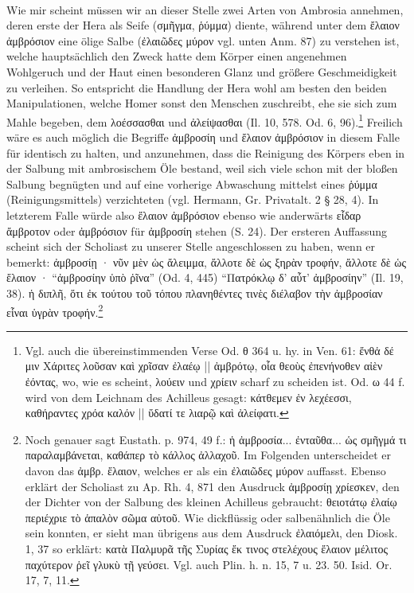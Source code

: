 \documentclass[a4paper, 11pt, oneside]{article}
\begin{document}
\paragraph{}
Wie mir scheint müssen wir an dieser Stelle zwei Arten von Ambrosia annehmen, deren erste der Hera als Seife (σμῆγμα, ῥύμμα) diente, während unter dem ἔλαιον ἀμβρόσιον eine ölige Salbe (ἐλαιῶδες μύρον vgl. unten Anm. 87) zu verstehen ist, welche hauptsächlich den Zweck hatte dem Körper einen angenehmen Wohlgeruch und der Haut einen besonderen Glanz und größere Geschmeidigkeit zu verleihen. So entspricht die Handlung der Hera wohl am besten den beiden Manipulationen, welche Homer sonst den Menschen zuschreibt, ehe sie sich zum Mahle begeben, dem λοέσσασθαι und ἀλείψασθαι (Il. 10, 578. Od. 6, 96).\footnote{Vgl. auch die übereinstimmenden Verse Od. θ 364 u. hy. in Ven. 61: ἔνθἁ δέ μιν Χάριτες λοῦσαν καὶ χρῖσαν ἐλαέῳ || ἀμβρότῳ, οἷα θεοὺς ἐπενήνοθεν αἰὲν ἐόντας, wo, wie es scheint, λούειν und χρίειν scharf zu scheiden ist. Od. ω 44 f. wird von dem Leichnam des Achilleus gesagt: κάτθεμεν ἐν λεχέεσσι, καθήραντες χρόα καλόν || ὕδατί τε λιαρῷ καὶ ἀλείφατι.} Freilich wäre es auch möglich die Begriffe ἀμβροσίη und ἔλαιον ἀμβρόσιον in diesem Falle für identisch zu halten, und anzunehmen, dass die Reinigung des Körpers eben in der Salbung mit ambrosischem Öle bestand, weil sich viele schon mit der bloßen Salbung begnügten und auf eine vorherige Abwaschung mittelst eines ῥύμμα (Reinigungsmittels) verzichteten (vgl. Hermann, Gr. Privatalt. 2 § 28, 4). In letzterem Falle würde also ἔλαιον ἀμβρόσιον ebenso wie anderwärts εἶδαρ ἄμβροτον oder ἀμβρόσιον für ἀμβροσίη stehen (S. 24). Der ersteren Auffassung scheint sich der Scholiast zu unserer Stelle angeschlossen zu haben, wenn er bemerkt: ἀμβροσίῃ · νῦν μὲν ὡς ἄλειμμα, ἄλλοτε δὲ ὡς ξηρὰν τροφήν, ἄλλοτε δὲ ὡς ἔλαιον · "`ἀμβροσίην ὑπὸ ῥῖνα"' (Od. 4, 445) "`Πατρόκλῳ δ' αὖτ' ἀμβροσίην"' (Il. 19, 38). ἡ διπλῆ, ὅτι ἐκ τούτου τοῦ τόπου πλανηθέντες τινὲς διέλαβον τὴν ἀμβροσίαν εἷναι ὑγρὰν τροφήν.\footnote{Noch genauer sagt Eustath. p. 974, 49 f.: ἡ ἀμβροσία... ἐνταῦθα... ὡς σμῆγμά τι παραλαμβάνεται, καθάπερ τὸ κάλλος ἀλλαχοῦ. Im Folgenden unterscheidet er davon das ἀμβρ. ἔλαιον, welches er als ein ἐλαιῶδες μύρον auffasst. Ebenso erklärt der Scholiast zu Ap. Rh. 4, 871 den Ausdruck ἀμβροσίῃ χρίεσκεν, den der Dichter von der Salbung des kleinen Achilleus gebraucht: θειοτάτῳ ἐλαίῳ περιέχριε τὸ ἁπαλὸν σῶμα αὐτοῦ. Wie dickflüssig oder salbenähnlich die Öle sein konnten, er sieht man übrigens aus dem Ausdruck ἐλαιόμελι, den Diosk. 1, 37 so erklärt: κατὰ Παλμυρᾶ τῆς Συρίας ἔκ τινος στελέχους ἔλαιον μέλιτος παχύτερον ῥεῖ γλυκὺ τῇ γεύσει. Vgl. auch Plin. h. n. 15, 7 u. 23. 50. Isid. Or. 17, 7, 11.}
\end{document}
